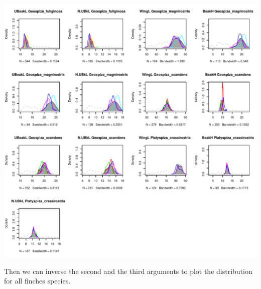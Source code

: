 \documentclass[12pt]{article}\usepackage[]{graphicx}\usepackage[]{color}
\makeatletter
\def\maxwidth{ %
  \ifdim\Gin@nat@width>\linewidth
    \linewidth
  \else
    \Gin@nat@width
  \fi
}
\newenvironment{knitrout}{}{} %
\makeatother
\begin{document}
\begin{knitrout}
\includegraphics[width=\maxwidth]{figure/unnamed-chunk-103} 

\end{knitrout}

\newpage

Then we can inverse the second and the third arguments to plot the distribution for all finches species. 
\end{document}
